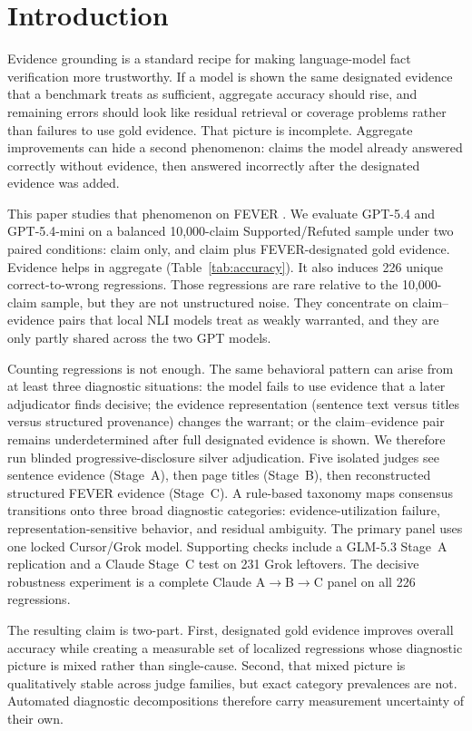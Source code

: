 \section{Introduction}
\label{sec:intro}

Evidence grounding is a standard recipe for making language-model fact verification more trustworthy.
If a model is shown the same designated evidence that a benchmark treats as sufficient, aggregate accuracy should rise, and remaining errors should look like residual retrieval or coverage problems rather than failures to use gold evidence.
That picture is incomplete.
Aggregate improvements can hide a second phenomenon: claims the model already answered correctly without evidence, then answered incorrectly after the designated evidence was added.

This paper studies that phenomenon on FEVER \citep{thorne-etal-2018-fever}.
We evaluate GPT-5.4 and GPT-5.4-mini on a balanced 10{,}000-claim Supported/Refuted sample under two paired conditions: claim only, and claim plus FEVER-designated gold evidence.
Evidence helps in aggregate (Table~\ref{tab:accuracy}).
It also induces 226 unique correct-to-wrong regressions.
Those regressions are rare relative to the 10{,}000-claim sample, but they are not unstructured noise.
They concentrate on claim--evidence pairs that local NLI models treat as weakly warranted, and they are only partly shared across the two GPT models.

Counting regressions is not enough.
The same behavioral pattern can arise from at least three diagnostic situations: the model fails to use evidence that a later adjudicator finds decisive; the evidence representation (sentence text versus titles versus structured provenance) changes the warrant; or the claim--evidence pair remains underdetermined after full designated evidence is shown.
We therefore run blinded progressive-disclosure silver adjudication.
Five isolated judges see sentence evidence (Stage~A), then page titles (Stage~B), then reconstructed structured FEVER evidence (Stage~C).
A rule-based taxonomy maps consensus transitions onto three broad diagnostic categories: evidence-utilization failure, representation-sensitive behavior, and residual ambiguity.
The primary panel uses one locked Cursor/Grok model.
Supporting checks include a GLM-5.3 Stage~A replication and a Claude Stage~C test on 231 Grok leftovers.
The decisive robustness experiment is a complete Claude A$\rightarrow$B$\rightarrow$C panel on all 226 regressions.

The resulting claim is two-part.
First, designated gold evidence improves overall accuracy while creating a measurable set of localized regressions whose diagnostic picture is mixed rather than single-cause.
Second, that mixed picture is qualitatively stable across judge families, but exact category prevalences are not.
Automated diagnostic decompositions therefore carry measurement uncertainty of their own.

